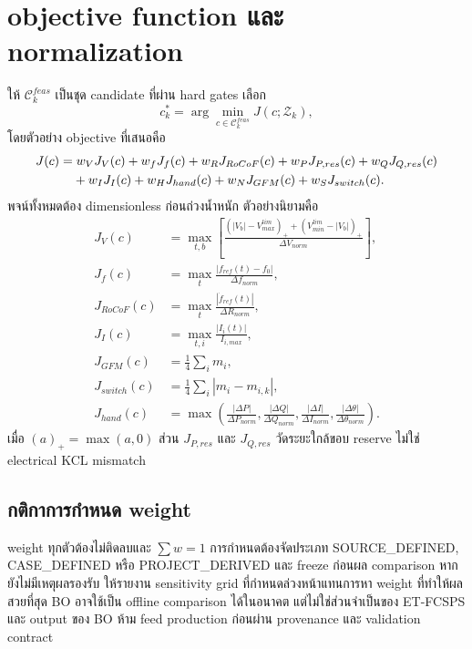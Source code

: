 \documentclass[12pt,a4paper]{article}
\begin{document}
\section{objective function และ normalization}

ให้ $\mathcal C_k^{feas}$ เป็นชุด candidate ที่ผ่าน hard gates เลือก
\begin{equation}
c_k^*=\arg\min_{c\in\mathcal C_k^{feas}}J(c;\mathcal Z_k),
\end{equation}
โดยตัวอย่าง objective ที่เสนอคือ
\begin{align}
J(c)=&\;w_VJ_V(c)+w_fJ_f(c)+w_RJ_{RoCoF}(c)+w_PJ_{P,res}(c)
+w_QJ_{Q,res}(c)\notag\\
&+w_IJ_I(c)+w_HJ_{hand}(c)+w_NJ_{GFM}(c)+w_SJ_{switch}(c).
\label{eq:cost}
\end{align}
พจน์ทั้งหมดต้อง dimensionless ก่อนถ่วงน้ำหนัก ตัวอย่างนิยามคือ
\begin{align}
J_V(c)&=\max_{t,b}\left[
\frac{(|V_b|-V_{max}^{lim})_+ +(V_{min}^{lim}-|V_b|)_+}{\Delta V_{norm}}
\right],\\
J_f(c)&=\max_t\frac{|f_{ref}(t)-f_0|}{\Delta f_{norm}},\\
J_{RoCoF}(c)&=\max_t\frac{|\dot f_{ref}(t)|}{\Delta R_{norm}},\\
J_I(c)&=\max_{t,i}\frac{|I_i(t)|}{I_{i,max}},\\
J_{GFM}(c)&=\frac{1}{4}\sum_i m_i,\\
J_{switch}(c)&=\frac{1}{4}\sum_i|m_i-m_{i,k}|,\\
J_{hand}(c)&=\max\left(
\frac{|\Delta P|}{\Delta P_{norm}},
\frac{|\Delta Q|}{\Delta Q_{norm}},
\frac{|\Delta I|}{\Delta I_{norm}},
\frac{|\Delta\theta|}{\Delta\theta_{norm}}
\right).
\end{align}
เมื่อ $(a)_+=\max(a,0)$ ส่วน $J_{P,res}$ และ $J_{Q,res}$ วัดระยะใกล้ขอบ reserve ไม่ใช่
electrical KCL mismatch

\subsection{กติกาการกำหนด weight}

weight ทุกตัวต้องไม่ติดลบและ $\sum w=1$ การกำหนดต้องจัดประเภท SOURCE\_DEFINED,
CASE\_DEFINED หรือ PROJECT\_DERIVED และ freeze ก่อนผล comparison หากยังไม่มีเหตุผลรองรับ
ให้รายงาน sensitivity grid ที่กำหนดล่วงหน้าแทนการหา weight ที่ทำให้ผลสวยที่สุด
BO อาจใช้เป็น offline comparison ได้ในอนาคต แต่ไม่ใช่ส่วนจำเป็นของ ET-FCSPS และ output ของ BO
ห้าม feed production ก่อนผ่าน provenance และ validation contract
\end{document}
